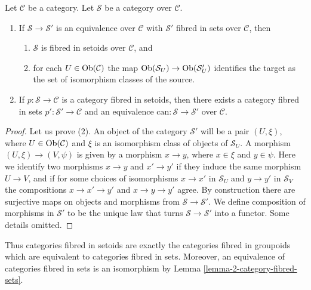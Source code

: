 \begin{lemma}
\label{lemma-setoid-fibres}
Let $\mathcal{C}$ be a category. Let $\mathcal{S}$ be a category
over $\mathcal{C}$.
\begin{enumerate}
\item If $\mathcal{S} \to \mathcal{S}'$ is an equivalence
over $\mathcal{C}$ with $\mathcal{S}'$ fibred in sets over $\mathcal{C}$,
then
\begin{enumerate}
\item $\mathcal{S}$ is fibred in setoids over $\mathcal{C}$, and
\item for each $U \in \mathop{\mathrm{Ob}}\nolimits(\mathcal{C})$ the map
$\mathop{\mathrm{Ob}}\nolimits(\mathcal{S}_U) \to \mathop{\mathrm{Ob}}\nolimits(\mathcal{S}'_U)$
identifies the target as the set of isomorphism classes of the source.
\end{enumerate}
\item If $p : \mathcal{S} \to \mathcal{C}$ is a category fibred in setoids,
then there exists a category fibred in sets
$p' : \mathcal{S}' \to \mathcal{C}$ and an equivalence
$\text{can} : \mathcal{S} \to \mathcal{S}'$ over $\mathcal{C}$.
\end{enumerate}
\end{lemma}

\begin{proof}
Let us prove (2).
An object of the category $\mathcal{S}'$ will be a pair $(U, \xi)$, where
$U \in \mathop{\mathrm{Ob}}\nolimits(\mathcal{C})$ and $\xi$ is an isomorphism class of objects
of $\mathcal{S}_U$. A morphism $(U, \xi) \to (V , \psi)$ is given by a
morphism $x \to y$, where $x \in \xi$ and $y \in \psi$. Here we identify
two morphisms $x \to y$ and $x' \to y'$ if they induce the same morphism
$U \to V$, and if for some choices of isomorphisms $x \to x'$ in
$\mathcal{S}_U$ and $y \to y'$ in $\mathcal{S}_V$ the compositions
$x \to x' \to y'$ and $x \to y \to y'$ agree. By construction there are
surjective maps on objects and morphisms from $\mathcal{S} \to
\mathcal{S}'$. We define composition of morphisms in $\mathcal{S}'$ to
be the unique law that turns $\mathcal{S} \to \mathcal{S}'$ into a functor.
Some details omitted.
\end{proof}

\noindent
Thus categories fibred in setoids are exactly the categories fibred
in groupoids which are equivalent to categories fibred in sets.
Moreover, an equivalence of categories fibred in sets is an isomorphism
by Lemma \ref{lemma-2-category-fibred-sets}.

